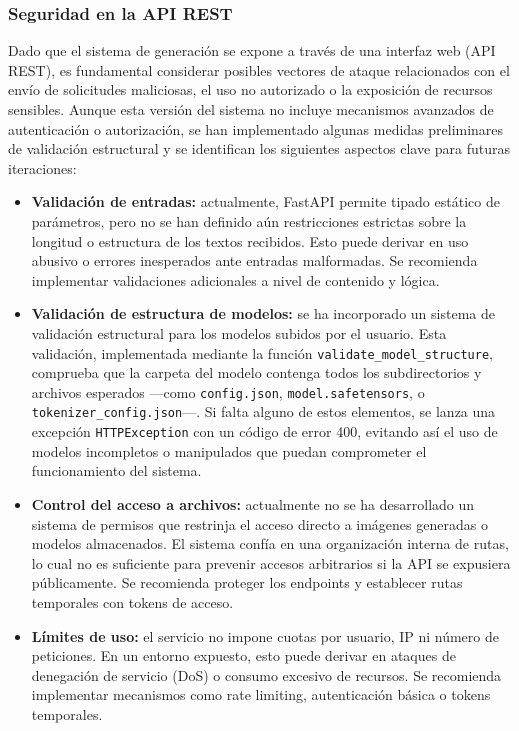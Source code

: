 \subsubsection{Seguridad en la API REST}

Dado que el sistema de generación se expone a través de una interfaz web (API REST), es fundamental considerar posibles vectores de ataque relacionados con el envío de solicitudes maliciosas, el uso no autorizado o la exposición de recursos sensibles. Aunque esta versión del sistema no incluye mecanismos avanzados de autenticación o autorización, se han implementado algunas medidas preliminares de validación estructural y se identifican los siguientes aspectos clave para futuras iteraciones:

\begin{itemize}
    \item \textbf{Validación de entradas:} actualmente, FastAPI permite tipado estático de parámetros, pero no se han definido aún restricciones estrictas sobre la longitud o estructura de los textos recibidos. Esto puede derivar en uso abusivo o errores inesperados ante entradas malformadas. Se recomienda implementar validaciones adicionales a nivel de contenido y lógica.
    
    \item \textbf{Validación de estructura de modelos:} se ha incorporado un sistema de validación estructural para los modelos subidos por el usuario. Esta validación, implementada mediante la función \texttt{validate\_model\_structure}, comprueba que la carpeta del modelo contenga todos los subdirectorios y archivos esperados —como \texttt{config.json}, \texttt{model.safetensors}, o \texttt{tokenizer\_config.json}—. Si falta alguno de estos elementos, se lanza una excepción \texttt{HTTPException} con un código de error 400, evitando así el uso de modelos incompletos o manipulados que puedan comprometer el funcionamiento del sistema.

    \item \textbf{Control del acceso a archivos:} actualmente no se ha desarrollado un sistema de permisos que restrinja el acceso directo a imágenes generadas o modelos almacenados. El sistema confía en una organización interna de rutas, lo cual no es suficiente para prevenir accesos arbitrarios si la API se expusiera públicamente. Se recomienda proteger los endpoints y establecer rutas temporales con tokens de acceso.

    \item \textbf{Límites de uso:} el servicio no impone cuotas por usuario, IP ni número de peticiones. En un entorno expuesto, esto puede derivar en ataques de denegación de servicio (DoS) o consumo excesivo de recursos. Se recomienda implementar mecanismos como rate limiting, autenticación básica o tokens temporales.


\end{itemize}
